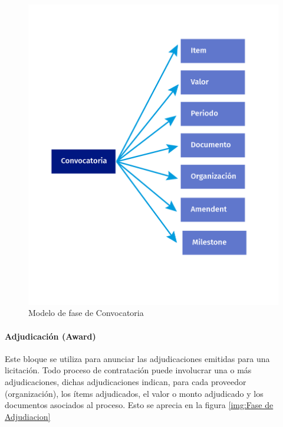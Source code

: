 \begin{figure}[h!]
    \centering
    \includegraphics[width=150mm]{figuras/Diagramas_Convocatoria.png}
    \caption{Modelo de fase de Convocatoria}
    \label{img:Fase de Convocatoria}
\end{figure}

\paragraph{Adjudicación (Award)}
Este bloque se utiliza para anunciar las adjudicaciones emitidas para una licitación. Todo proceso de contratación puede involucrar una o más adjudicaciones, dichas adjudicaciones indican, para cada proveedor (organización), los ítems adjudicados, el valor o monto adjudicado y los documentos asociados al proceso. Esto se aprecia en la figura \ref{img:Fase de Adjudiacion}


